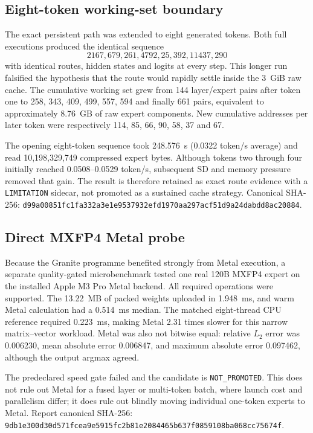 \subsection{Eight-token working-set boundary}
The exact persistent path was extended to eight generated tokens.  Both full
executions produced the identical sequence
\[
  2167,679,261,4792,25,392,11437,290
\]
with identical routes, hidden states and logits at every step.  This longer
run falsified the hypothesis that the route would rapidly settle inside the
3~GiB raw cache.  The cumulative working set grew from 144 layer/expert pairs
after token one to 258, 343, 409, 499, 557, 594 and finally 661 pairs,
equivalent to approximately 8.76~GB of raw expert components.  New cumulative
addresses per later token were respectively 114, 85, 66, 90, 58, 37 and 67.

The opening eight-token sequence took 248.576~s (0.0322 token/s average) and
read 10,198,329,749 compressed expert bytes.  Although tokens two through four
initially reached 0.0508--0.0529 token/s, subsequent SD and memory pressure
removed that gain.  The result is therefore retained as exact route evidence
with a \texttt{LIMITATION} sidecar, not promoted as a sustained cache
strategy.  Canonical SHA-256:
\texttt{d99a00851fc1fa332a3e1e9537932efd1970aa297acf51d9a24dabdd8ac20884}.

\subsection{Direct MXFP4 Metal probe}
Because the Granite programme benefited strongly from Metal execution, a
separate quality-gated microbenchmark tested one real 120B MXFP4 expert on the
installed Apple M3 Pro Metal backend.  All required operations were supported.
The 13.22~MB of packed weights uploaded in 1.948~ms, and warm Metal calculation
had a 0.514~ms median.  The matched eight-thread CPU reference required
0.223~ms, making Metal 2.31 times slower for this narrow matrix--vector
workload.  Metal was also not bitwise equal: relative $L_2$ error was
0.006230, mean absolute error 0.006847, and maximum absolute error 0.097462,
although the output argmax agreed.

The predeclared speed gate failed and the candidate is
\texttt{NOT\_PROMOTED}.  This does not rule out Metal for a fused layer or
multi-token batch, where launch cost and parallelism differ; it does rule out
blindly moving individual one-token experts to Metal.  Report canonical
SHA-256:
\texttt{9db1e300d30d571fcea9e5915fc2b81e2084465b637f0859108ba068cc75674f}.

